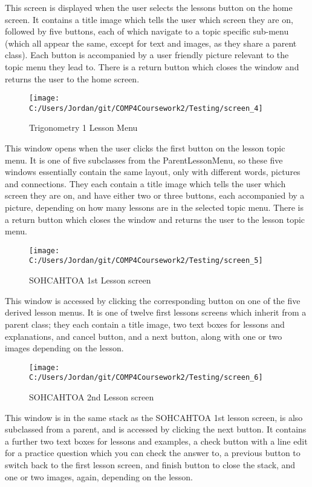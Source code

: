This screen is displayed when the user selects the lessons button on the home screen. It contains a title image which tells the user which screen they are on, followed by five buttons, each of which navigate to a topic specific sub-menu (which all appear the same, except for text and images, as they share a parent class). Each button is accompanied by a user friendly picture relevant to the topic menu they lead to. There is a return button which closes the window and returns the user to the home screen.

\begin{figure}[H]
    \label{fig: Second Screen}\caption{Trigonometry 1 Lesson Menu}
    \texttt{[image: C:/Users/Jordan/git/COMP4Coursework2/Testing/screen\_4]}
\end{figure}

This window opens when the user clicks the first button on the lesson topic menu. It is one of five subclasses from the ParentLessonMenu, so these five windows essentially contain the same layout, only with different words, pictures and connections. They each contain a title image which tells the user which screen they are on, and have either two or three buttons, each accompanied by a picture, depending on how many lessons are in the selected topic menu. There is a return button which closes the window and returns the user to the lesson topic menu.

\begin{figure}[H]
    \label{fig: Second Screen}\caption{SOHCAHTOA 1st Lesson screen}
    \texttt{[image: C:/Users/Jordan/git/COMP4Coursework2/Testing/screen\_5]}
\end{figure}

This window is accessed by clicking the corresponding button on one of the five derived lesson menus. It is one of twelve first lessons screens which inherit from a parent class; they each contain a title image, two text boxes for lessons and explanations, and cancel button, and a next button, along with one or two images depending on the lesson.

\begin{figure}[H]
    \label{fig: Second Screen}\caption{SOHCAHTOA 2nd Lesson screen}
    \texttt{[image: C:/Users/Jordan/git/COMP4Coursework2/Testing/screen\_6]}
\end{figure}

This window is in the same stack as the SOHCAHTOA 1st lesson screen, is also subclassed from a parent, and is accessed by clicking the next button. It contains a further two text boxes for lessons and examples, a check button with a line edit for a practice question which you can check the answer to, a previous button to switch back to the first lesson screen, and finish button to close the stack, and one or two images, again, depending on the lesson.

